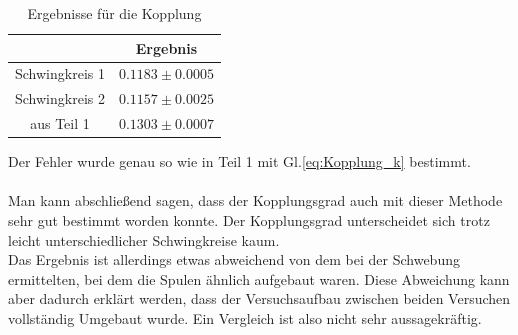 \documentclass[12pt,a4paper]{article}
\begin{document}
\begin{table}[H]
\begin{center}
\begin{tabular}{|c|c|}
\hline 
 & Ergebnis\\ 
\hline 
Schwingkreis 1  & $0.1183\pm 0.0005$ \\ 
\hline 
Schwingkreis 2 & $0.1157\pm  0.0025$\\ 
\hline 
aus Teil 1 & $0.1303\pm  0.0007$\\ 
\hline 
\end{tabular} 
\end{center}
\label{tab:Ergebnisse_k}
\caption{Ergebnisse für die Kopplung}
\end{table}

Der Fehler wurde genau so wie in Teil 1 mit Gl.\ref{eq:Kopplung_k} bestimmt.\\
\\
Man kann abschließend sagen, dass der Kopplungsgrad auch mit dieser Methode sehr gut bestimmt worden konnte. Der Kopplungsgrad unterscheidet sich trotz leicht unterschiedlicher Schwingkreise kaum.\\
Das Ergebnis ist allerdings etwas abweichend von dem bei der Schwebung ermittelten, bei dem die Spulen ähnlich aufgebaut waren. Diese Abweichung kann aber dadurch erklärt werden, dass der Versuchsaufbau zwischen beiden Versuchen vollständig Umgebaut wurde. Ein Vergleich ist also nicht sehr aussagekräftig.
\end{document}

